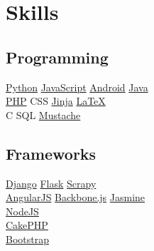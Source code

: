\documentclass[]{joaosoares-resume}
\begin{document}
\begin{minipage}[t]{0.35\textwidth}



\section{Skills}

\subsection{Programming}
\href{http://www.python.org}{Python} \textbullet{}
\href{http://www.php.net}{JavaScript} \textbullet{}
\href{http://android.com}{Android} \textbullet{}
\href{https://www.oracle.com/java/}{Java}\\
\href{http://www.php.net}{PHP} \textbullet{}
CSS \textbullet{}
\href{http://jinja.pocoo.org/}{Jinja} \textbullet{}
\href{http://www.latex-project.org}{\LaTeX} \\
C \textbullet{}
SQL \textbullet{}
\href{https://mustache.github.io/}{Mustache}\\
\sectionsep

\subsection{Frameworks}
\href{https://www.djangoproject.com/}{Django} \textbullet{}
\href{http://flask.pocoo.org/}{Flask} \textbullet{}
\href{https://scrapy.org/}{Scrapy} \\
\href{https://angularjs.org}{AngularJS} \textbullet{}
\href{https://backbonejs.org/}{Backbone.js} \textbullet{}
\href{https://jasmine.github.io/}{Jasmine} \\
\href{https://nodejs.org/en/}{NodeJS} \\
\href{https://cakephp.org/}{CakePHP} \\
\href{http://getbootstrap.com/}{Bootstrap} \\
\sectionsep


\end{minipage}
\end{document}
